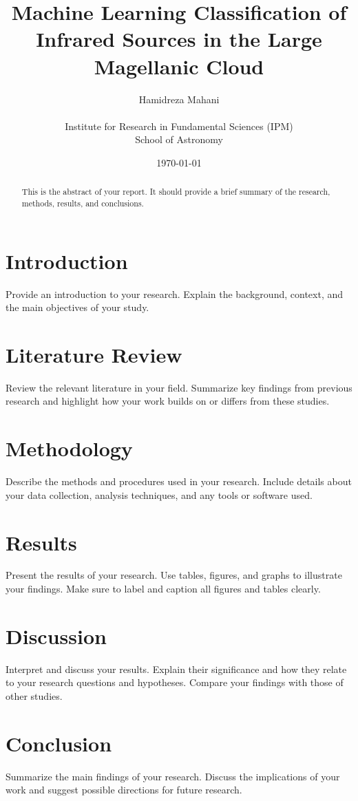 \documentclass[a4paper, 15pt,usenatbib]{article}
\title{Machine Learning Classification of Infrared
Sources in the Large Magellanic Cloud}
\author{Hamidreza Mahani \\
    \\
        Institute for Research in Fundamental Sciences (IPM) \\
        School of Astronomy}
\date{\today}
\begin{document}
\maketitle

\begin{abstract}
    This is the abstract of your report. It should provide a brief summary of the research, methods, results, and conclusions. 
\end{abstract}

\tableofcontents
\newpage

\section{Introduction}
Provide an introduction to your research. Explain the background, context, and the main objectives of your study. \citep{Willson2000}

\section{Literature Review}
Review the relevant literature in your field. Summarize key findings from previous research and highlight how your work builds on or differs from these studies.

\section{Methodology}
Describe the methods and procedures used in your research. Include details about your data collection, analysis techniques, and any tools or software used.

\section{Results}
Present the results of your research. Use tables, figures, and graphs to illustrate your findings. Make sure to label and caption all figures and tables clearly.

\section{Discussion}
Interpret and discuss your results. Explain their significance and how they relate to your research questions and hypotheses. Compare your findings with those of other studies.

\section{Conclusion}
Summarize the main findings of your research. Discuss the implications of your work and suggest possible directions for future research.
\end{document}

